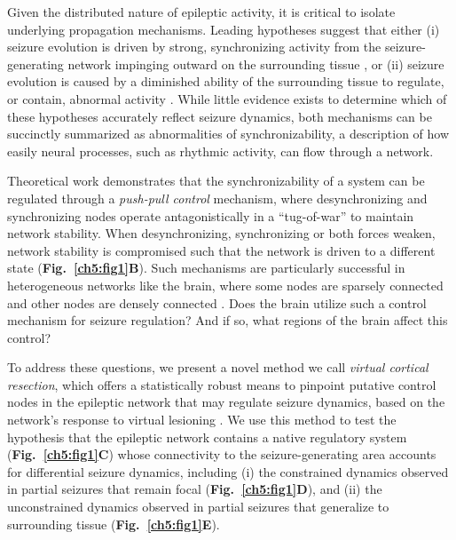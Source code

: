 Given the distributed nature of epileptic activity, it is critical to isolate underlying propagation mechanisms. Leading hypotheses suggest that either (i) seizure evolution is driven by strong, synchronizing activity from the seizure-generating network impinging outward on the surrounding tissue \cite{schindler2008evolving, kramer2010coalescence, kramer2012epilepsy, jiruska2012synchronization}, or (ii) seizure evolution is caused by a diminished ability of the surrounding tissue to regulate, or contain, abnormal activity \cite{nair2004critical, bower2012spatiotemporal}. While little evidence exists to determine which of these hypotheses accurately reflect seizure dynamics, both mechanisms can be succinctly summarized as abnormalities of synchronizability, a description of how easily neural processes, such as rhythmic activity, can flow through a network.

Theoretical work demonstrates that the synchronizability of a system can be regulated through a \textit{push-pull control} mechanism, where desynchronizing and synchronizing nodes operate antagonistically in a ``tug-of-war'' to maintain network stability. When desynchronizing, synchronizing or both forces weaken, network stability is compromised such that the network is driven to a different state \cite{he2014control} (\textbf{Fig.~\ref{ch5:fig1}B}). Such mechanisms are particularly successful in heterogeneous networks like the brain, where some nodes are sparsely connected and other nodes are densely connected \cite{wang2002synchronization}. Does the brain utilize such a control mechanism for seizure regulation? And if so, what regions of the brain affect this control?

To address these questions, we present a novel method we call \textit{virtual cortical resection}, which offers a statistically robust means to pinpoint putative control nodes in the epileptic network that may regulate seizure dynamics, based on the network's response to virtual lesioning \cite{wang2002synchronization, wang2002pinning}. We use this method to test the hypothesis that the epileptic network contains a native regulatory system (\textbf{Fig.~\ref{ch5:fig1}C}) whose connectivity to the seizure-generating area accounts for differential seizure dynamics, including (i) the constrained dynamics observed in partial seizures that remain focal (\textbf{Fig.~\ref{ch5:fig1}D}), and (ii) the unconstrained dynamics observed in partial seizures that generalize to surrounding tissue (\textbf{Fig.~\ref{ch5:fig1}E}).


